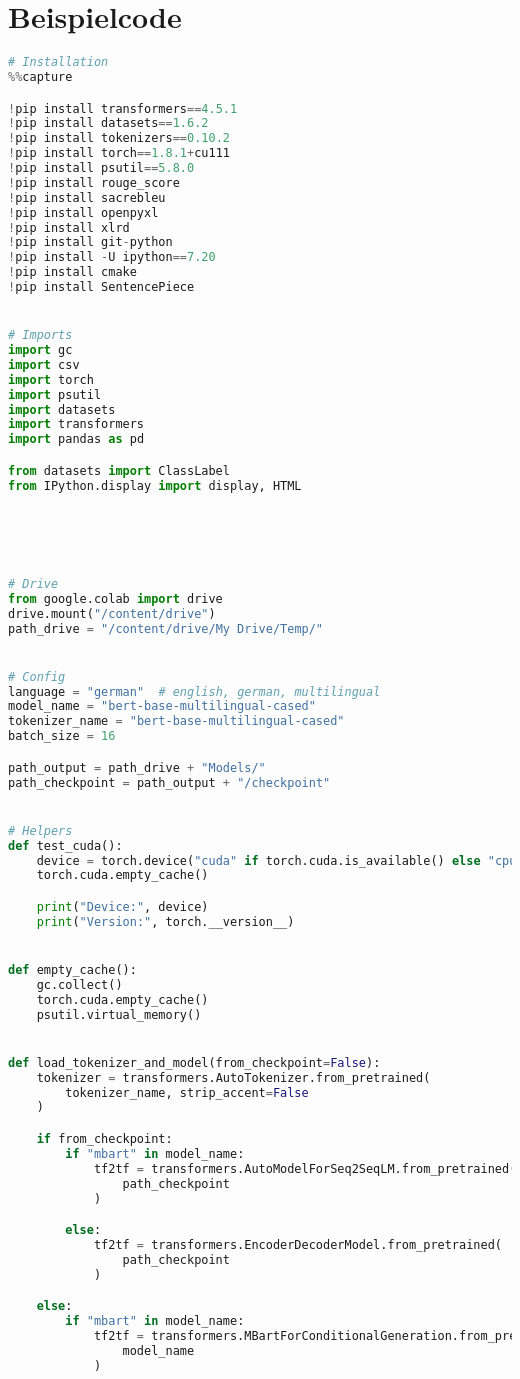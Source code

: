 \section*{Beispielcode}
\begin{lstlisting}[language=Python, caption=Beispielcode]
# Installation
%%capture

!pip install transformers==4.5.1
!pip install datasets==1.6.2
!pip install tokenizers==0.10.2
!pip install torch==1.8.1+cu111
!pip install psutil==5.8.0
!pip install rouge_score
!pip install sacrebleu
!pip install openpyxl
!pip install xlrd
!pip install git-python
!pip install -U ipython==7.20
!pip install cmake
!pip install SentencePiece


# Imports
import gc
import csv
import torch
import psutil
import datasets
import transformers
import pandas as pd

from datasets import ClassLabel
from IPython.display import display, HTML





# Drive
from google.colab import drive
drive.mount("/content/drive")
path_drive = "/content/drive/My Drive/Temp/"


# Config
language = "german"  # english, german, multilingual
model_name = "bert-base-multilingual-cased"
tokenizer_name = "bert-base-multilingual-cased"
batch_size = 16

path_output = path_drive + "Models/"
path_checkpoint = path_output + "/checkpoint"


# Helpers
def test_cuda():
    device = torch.device("cuda" if torch.cuda.is_available() else "cpu")
    torch.cuda.empty_cache()

    print("Device:", device)
    print("Version:", torch.__version__)


def empty_cache():
    gc.collect()
    torch.cuda.empty_cache()
    psutil.virtual_memory()


def load_tokenizer_and_model(from_checkpoint=False):
    tokenizer = transformers.AutoTokenizer.from_pretrained(
        tokenizer_name, strip_accent=False
    )

    if from_checkpoint:
        if "mbart" in model_name:
            tf2tf = transformers.AutoModelForSeq2SeqLM.from_pretrained(
                path_checkpoint
            )

        else:
            tf2tf = transformers.EncoderDecoderModel.from_pretrained(
                path_checkpoint
            )

    else:
        if "mbart" in model_name:
            tf2tf = transformers.MBartForConditionalGeneration.from_pretrained(
                model_name
            )


\end{lstlisting}
